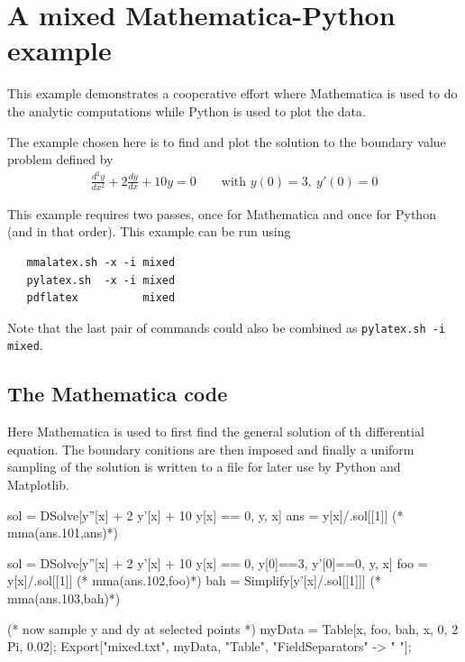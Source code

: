 \documentclass[12pt]{article}
\begin{document}
\section*{A mixed Mathematica-Python example}

This example demonstrates a cooperative effort where Mathematica is used to do the analytic computations while Python is used to plot the data.

The example chosen here is to find and plot the solution to the boundary value problem defined by
\begin{align*}
   \frac{d^2y}{dx^2} + 2 \frac{dy}{dx} + 10 y = 0\quad\quad\text{with }y(0)=3,\> y'(0)=0
\end{align*}

This example requires two passes, once for Mathematica and once for Python (and in that order). This example can be run using

\vspace{5pt}

\begin{lstlisting}
   mmalatex.sh -x -i mixed
   pylatex.sh  -x -i mixed
   pdflatex          mixed
\end{lstlisting}

\vspace{5pt}

Note that the last pair of commands could also be combined as {\small\tt pylatex.sh -i mixed}.

\subsection*{The Mathematica code}

Here Mathematica is used to first find the general solution of th differential equation.
The boundary conitions are then imposed and finally a uniform sampling of the solution
is written to a file for later use by Python and Matplotlib.

\vspace{10pt}

\begin{mathematica}
   sol = DSolve[y''[x] + 2 y'[x] + 10 y[x] == 0, y, x]
   ans = y[x]/.sol[[1]]                  (* mma(ans.101,ans)*)

   sol = DSolve[{y''[x] + 2 y'[x] + 10 y[x] == 0, y[0]==3, y'[0]==0}, y, x]
   foo = y[x]/.sol[[1]]                  (* mma(ans.102,foo)*)
   bah = Simplify[y'[x]/.sol[[1]]]       (* mma(ans.103,bah)*)

   (* now sample y and dy at selected points *)
   myData = Table[{x, foo, bah}, {x, 0, 2 Pi, 0.02}];
   Export["mixed.txt", myData, "Table",  "FieldSeparators" -> " "];
\end{mathematica}
\end{document}
